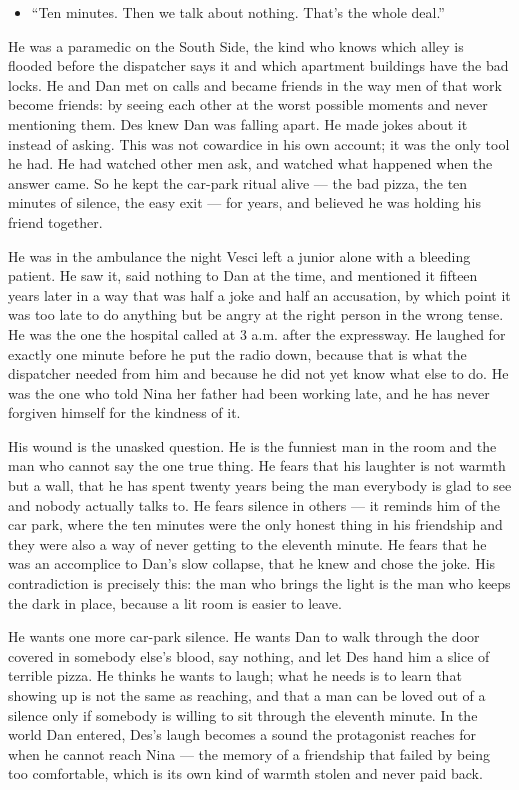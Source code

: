 \documentclass{design/chronicle}
\begin{document}
{\begin{itemize}[leftmargin=1.4em,itemsep=1pt,topsep=3pt,parsep=0pt]
\item “Ten minutes. Then we talk about nothing. That’s the whole deal.”

\end{itemize}

He was a paramedic on the South Side, the kind who knows which alley is flooded before the dispatcher says it and which apartment buildings have the bad locks. He and Dan met on calls and became friends in the way men of that work become friends: by seeing each other at the worst possible moments and never mentioning them. Des knew Dan was falling apart. He made jokes about it instead of asking. This was not cowardice in his own account; it was the only tool he had. He had watched other men ask, and watched what happened when the answer came. So he kept the car-park ritual alive — the bad pizza, the ten minutes of silence, the easy exit — for years, and believed he was holding his friend together.

He was in the ambulance the night Vesci left a junior alone with a bleeding patient. He saw it, said nothing to Dan at the time, and mentioned it fifteen years later in a way that was half a joke and half an accusation, by which point it was too late to do anything but be angry at the right person in the wrong tense. He was the one the hospital called at 3 a.m. after the expressway. He laughed for exactly one minute before he put the radio down, because that is what the dispatcher needed from him and because he did not yet know what else to do. He was the one who told Nina her father had been working late, and he has never forgiven himself for the kindness of it.

His wound is the unasked question. He is the funniest man in the room and the man who cannot say the one true thing. He fears that his laughter is not warmth but a wall, that he has spent twenty years being the man everybody is glad to see and nobody actually talks to. He fears silence in others — it reminds him of the car park, where the ten minutes were the only honest thing in his friendship and they were also a way of never getting to the eleventh minute. He fears that he was an accomplice to Dan’s slow collapse, that he knew and chose the joke. His contradiction is precisely this: the man who brings the light is the man who keeps the dark in place, because a lit room is easier to leave.

He wants one more car-park silence. He wants Dan to walk through the door covered in somebody else’s blood, say nothing, and let Des hand him a slice of terrible pizza. He thinks he wants to laugh; what he needs is to learn that showing up is not the same as reaching, and that a man can be loved out of a silence only if somebody is willing to sit through the eleventh minute. In the world Dan entered, Des’s laugh becomes a sound the protagonist reaches for when he cannot reach Nina — the memory of a friendship that failed by being too comfortable, which is its own kind of warmth stolen and never paid back.

}
\end{document}

